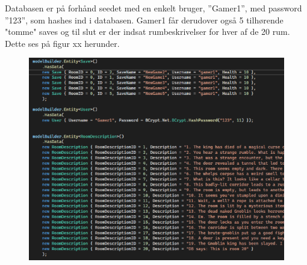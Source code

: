 Databasen er på forhånd seedet med en enkelt bruger, ”Gamer1”, med password ”123”, som hashes ind i databasen. Gamer1 får derudover også 5 tilhørende "tomme" saves og til slut er der indsat rumbeskrivelser for hver af de 20 rum. Dette ses på figur xx herunder. \\

\begin{figure}[H]
\centering
\includegraphics[width = \textwidth]{02-Body/Images/DAL-Database/DbSeeding.PNG}
\caption{}
\label{fig:DbSeeding}
\end{figure}